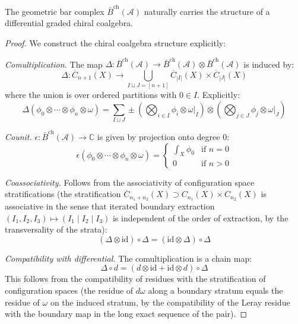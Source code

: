 \begin{theorem}\label{thm:bar-chiral}
The geometric bar complex $\bar{B}^{\text{ch}}(\mathcal{A})$ naturally carries the structure of a differential graded chiral coalgebra.
\end{theorem}

\begin{proof}
We construct the chiral coalgebra structure explicitly:

\emph{Comultiplication.} The map $\Delta: \bar{B}^{\text{ch}}(\mathcal{A}) \to \bar{B}^{\text{ch}}(\mathcal{A}) \otimes \bar{B}^{\text{ch}}(\mathcal{A})$ is induced by:
\[
\Delta: \overline{C}_{n+1}(X) \to \bigcup_{I \sqcup J = [n+1]} \overline{C}_{|I|}(X) \times \overline{C}_{|J|}(X)
\]
where the union is over ordered partitions with $0 \in I$. Explicitly:
\[
\Delta(\phi_0 \otimes \cdots \otimes \phi_n \otimes \omega) = \sum_{I \sqcup J} \pm \left(\bigotimes_{i \in I} \phi_i \otimes \omega|_I\right) \otimes \left(\bigotimes_{j \in J} \phi_j \otimes \omega|_J\right)
\]

\emph{Counit.} $\epsilon: \bar{B}^{\text{ch}}(\mathcal{A}) \to \mathbb{C}$ is given by projection onto degree 0:
\[
\epsilon(\phi_0 \otimes \cdots \otimes \phi_n \otimes \omega) = \begin{cases}
\int_X \phi_0 & \text{if } n = 0 \\
0 & \text{if } n > 0
\end{cases}
\]

\emph{Coassociativity.} Follows from the associativity of configuration space stratifications
(the stratification $\overline{C}_{n_1+n_2}(X) \supset C_{n_1}(X) \times C_{n_2}(X)$ is associative in the sense that iterated boundary extraction $(I_1, I_2, I_3) \mapsto (I_1 \mid I_2 \mid I_3)$ is independent of the order of extraction, by the transversality of the strata):
\[
(\Delta \otimes \text{id}) \circ \Delta = (\text{id} \otimes \Delta) \circ \Delta
\]

\emph{Compatibility with differential.} The comultiplication is a chain map:
\[
\Delta \circ d = (d \otimes \text{id} + \text{id} \otimes d) \circ \Delta
\]
This follows from the compatibility of residues with the stratification of configuration spaces
(the residue of $d\omega$ along a boundary stratum equals the residue of $\omega$ on the induced stratum, by the compatibility of the Leray residue with the boundary map in the long exact sequence of the pair).
\end{proof}

